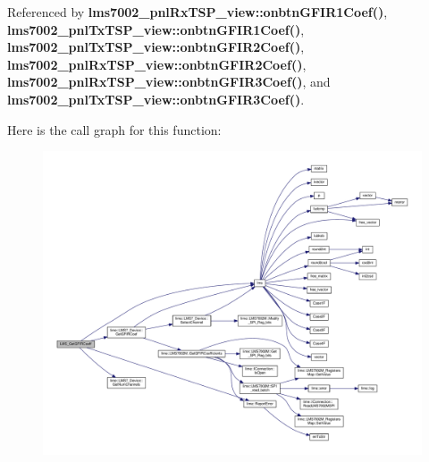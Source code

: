 Referenced by {\bf lms7002\+\_\+pnl\+Rx\+T\+S\+P\+\_\+view\+::onbtn\+G\+F\+I\+R1\+Coef()}, {\bf lms7002\+\_\+pnl\+Tx\+T\+S\+P\+\_\+view\+::onbtn\+G\+F\+I\+R1\+Coef()}, {\bf lms7002\+\_\+pnl\+Tx\+T\+S\+P\+\_\+view\+::onbtn\+G\+F\+I\+R2\+Coef()}, {\bf lms7002\+\_\+pnl\+Rx\+T\+S\+P\+\_\+view\+::onbtn\+G\+F\+I\+R2\+Coef()}, {\bf lms7002\+\_\+pnl\+Rx\+T\+S\+P\+\_\+view\+::onbtn\+G\+F\+I\+R3\+Coef()}, and {\bf lms7002\+\_\+pnl\+Tx\+T\+S\+P\+\_\+view\+::onbtn\+G\+F\+I\+R3\+Coef()}.



Here is the call graph for this function\+:
\nopagebreak
\begin{figure}[H]
\begin{center}
\leavevmode
\includegraphics[width=350pt]{df/de1/lms7__api_8cpp_a4cb5c68cc1a3bb7e63f2b64b3d7ca15c_cgraph}
\end{center}
\end{figure}




